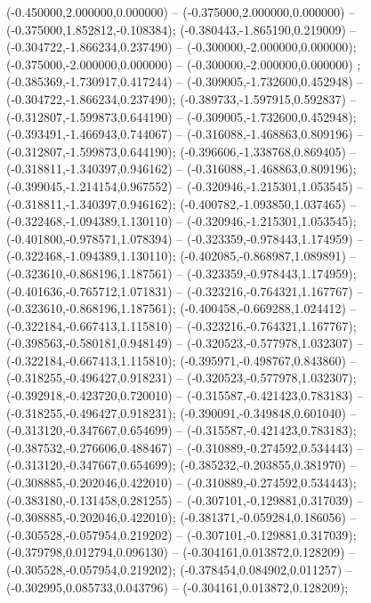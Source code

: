  (-0.450000,2.000000,0.000000) -- (-0.375000,2.000000,0.000000) -- (-0.375000,1.852812,-0.108384);
 (-0.380443,-1.865190,0.219009) -- (-0.304722,-1.866234,0.237490) -- (-0.300000,-2.000000,0.000000);
 (-0.375000,-2.000000,0.000000) -- (-0.300000,-2.000000,0.000000) ;
 (-0.385369,-1.730917,0.417244) -- (-0.309005,-1.732600,0.452948) -- (-0.304722,-1.866234,0.237490);
 (-0.389733,-1.597915,0.592837) -- (-0.312807,-1.599873,0.644190) -- (-0.309005,-1.732600,0.452948);
 (-0.393491,-1.466943,0.744067) -- (-0.316088,-1.468863,0.809196) -- (-0.312807,-1.599873,0.644190);
 (-0.396606,-1.338768,0.869405) -- (-0.318811,-1.340397,0.946162) -- (-0.316088,-1.468863,0.809196);
 (-0.399045,-1.214154,0.967552) -- (-0.320946,-1.215301,1.053545) -- (-0.318811,-1.340397,0.946162);
 (-0.400782,-1.093850,1.037465) -- (-0.322468,-1.094389,1.130110) -- (-0.320946,-1.215301,1.053545);
 (-0.401800,-0.978571,1.078394) -- (-0.323359,-0.978443,1.174959) -- (-0.322468,-1.094389,1.130110);
 (-0.402085,-0.868987,1.089891) -- (-0.323610,-0.868196,1.187561) -- (-0.323359,-0.978443,1.174959);
 (-0.401636,-0.765712,1.071831) -- (-0.323216,-0.764321,1.167767) -- (-0.323610,-0.868196,1.187561);
 (-0.400458,-0.669288,1.024412) -- (-0.322184,-0.667413,1.115810) -- (-0.323216,-0.764321,1.167767);
 (-0.398563,-0.580181,0.948149) -- (-0.320523,-0.577978,1.032307) -- (-0.322184,-0.667413,1.115810);
 (-0.395971,-0.498767,0.843860) -- (-0.318255,-0.496427,0.918231) -- (-0.320523,-0.577978,1.032307);
 (-0.392918,-0.423720,0.720010) -- (-0.315587,-0.421423,0.783183) -- (-0.318255,-0.496427,0.918231);
 (-0.390091,-0.349848,0.601040) -- (-0.313120,-0.347667,0.654699) -- (-0.315587,-0.421423,0.783183);
 (-0.387532,-0.276606,0.488467) -- (-0.310889,-0.274592,0.534443) -- (-0.313120,-0.347667,0.654699);
 (-0.385232,-0.203855,0.381970) -- (-0.308885,-0.202046,0.422010) -- (-0.310889,-0.274592,0.534443);
 (-0.383180,-0.131458,0.281255) -- (-0.307101,-0.129881,0.317039) -- (-0.308885,-0.202046,0.422010);
 (-0.381371,-0.059284,0.186056) -- (-0.305528,-0.057954,0.219202) -- (-0.307101,-0.129881,0.317039);
 (-0.379798,0.012794,0.096130) -- (-0.304161,0.013872,0.128209) -- (-0.305528,-0.057954,0.219202);
 (-0.378454,0.084902,0.011257) -- (-0.302995,0.085733,0.043796) -- (-0.304161,0.013872,0.128209);
